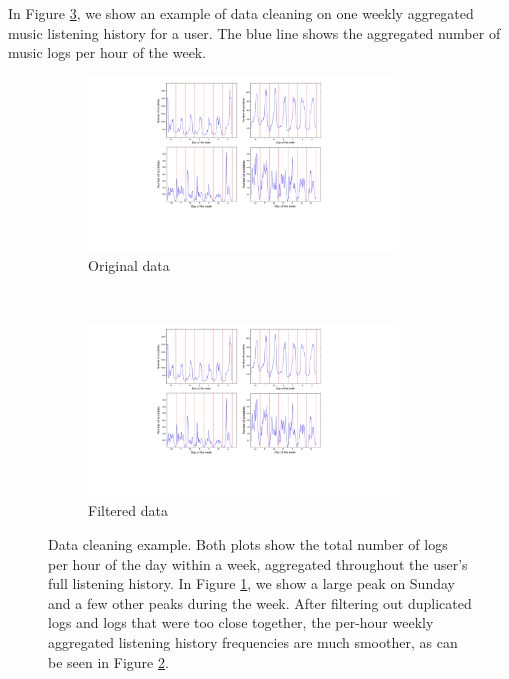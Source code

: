 In Figure \ref{fig:data_cleaning}, we show an example of data cleaning on one weekly aggregated music listening history for a user. The blue line shows the aggregated number of music logs per hour of the week.
\begin{figure}[!h]
	\centering
	\vspace{10pt}
	\begin{subfigure}[b]{0.5\textwidth}
		\centering
		\includegraphics[width=0.9\textwidth]{Cwoeness_OR.pdf}
        \caption{Original data}
        \label{fig:data_cleaning_1}
	\end{subfigure}%
    ~
	\begin{subfigure}[b]{0.5\textwidth}
		\centering
		\includegraphics[width=0.9\textwidth]{Cwoeness_CL.pdf}
        \caption{Filtered data}
        \label{fig:data_cleaning_2}
	\end{subfigure}
\caption[Data cleaning example of a weekly aggregated music listening history]{Data cleaning example. Both plots show the total number of logs per hour of the day within a week, aggregated throughout the user's full listening history. In Figure \ref{fig:data_cleaning_1}, we show a large peak on Sunday and a few other peaks during the week. After filtering out duplicated logs and logs that were too close together, the per-hour weekly aggregated listening history frequencies are much smoother, as can be seen in Figure \ref{fig:data_cleaning_2}.}\label{fig:data_cleaning}
\end{figure}
